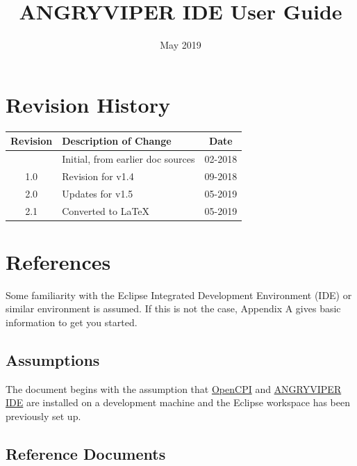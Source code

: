 \documentclass[10pt, a4paper, oneside]{article}
\begin{document}
\title {ANGRYVIPER IDE User Guide}
\author{}
\date{May 2019} %
\begin{titlepage}
\maketitle{} %
\end{titlepage}

\section{Revision History}
\renewcommand{\arraystretch}{2}
\begin{tabular}{|c|p{11cm}|c|}
\hline
Revision & Description of Change & Date\\
\hline
& Initial, from earlier doc sources & 02-2018\\ \hline
1.0 & Revision for v1.4& 09-2018\\  \hline
2.0 & Updates for v1.5 & 05-2019 \\\hline
2.1 & Converted to \LaTeX & 05-2019\\
\hline
\end{tabular}

\setcounter{tocdepth}{2}
\tableofcontents
{}
\newpage
\listoftables
\listoffigures
\newpage
{}
\section{References}
Some familiarity with the Eclipse Integrated Development Environment (IDE) or similar environment is assumed. If this is not the case, Appendix A gives basic information to get you started.

\subsection{Assumptions}
The document begins with the assumption that \href{https://github.com/opencpi/opencpi}{OpenCPI} and \href{https://github.com/opencpi/angryviper_gui}{ANGRYVIPER IDE} are installed on a development machine and the Eclipse workspace has been previously set up.
\subsection{Reference Documents}
\def\myreferences{
\hline
OpenCPI Website &
\href{https://www.opencpi.org}{www.opencpi.org} \\
\hline
OpenCPI Component Development Guide &
\githubio{OpenCPI\_Component\_Development.pdf} \\
\hline
OpenCPI Application Development Guide &
\githubio{OpenCPI\_Application\_Development.pdf} \\
}

\end{document}
